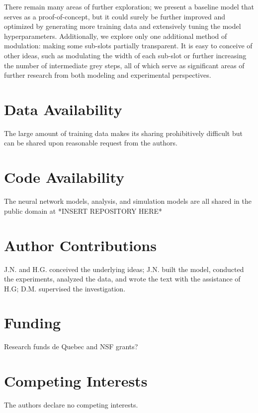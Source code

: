 \documentclass[11pt]{article}
\begin{document}
\noindent There remain many areas of further exploration; we present a baseline model that serves as a proof-of-concept, but it could surely be further improved and optimized by generating more training data and extensively tuning the model hyperparameters. Additionally, we explore only one additional method of modulation: making some sub-slots partially transparent. It is easy to conceive of other ideas, such as modulating the width of each sub-slot or further increasing the number of intermediate grey steps, all of which serve as significant areas of further research from both modeling and experimental perspectives.

\section*{Data Availability}
The large amount of training data makes its sharing prohibitively difficult but can be shared upon reasonable request from the authors.

\section*{Code Availability}
The neural network models, analysis, and simulation models are all shared in the public domain at *INSERT REPOSITORY HERE*

\section*{Author Contributions}
J.N. and H.G. conceived the underlying ideas; J.N. built the model, conducted the experiments, analyzed the data, and wrote the text with the assistance of H.G; D.M. supervised the investigation.

\section*{Funding}
Research funds de Quebec and NSF grants?

\section*{Competing Interests}
The authors declare no competing interests. 



\end{document}
